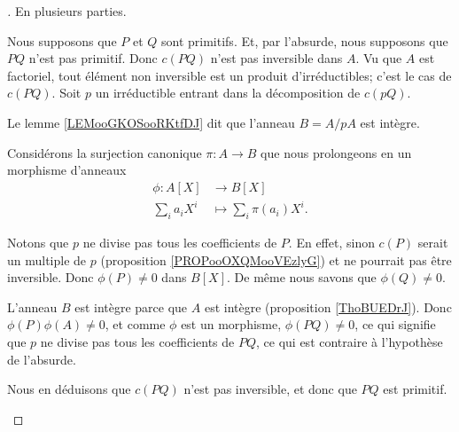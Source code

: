 \begin{proof}[\cite{BIBooXBJQooOCerti}]
	En plusieurs parties.
	\begin{subproof}
		\spitem[\ref{ITEMooISPDooXdRywE}\( \Rightarrow\)]
		Nous supposons que \( P\) et \( Q\) sont primitifs. Et, par l'absurde, nous supposons que \( PQ\) n'est pas primitif. Donc \( c(PQ)\) n'est pas inversible dans \( A\). Vu que \( A\) est factoriel, tout élément non inversible est un produit d'irréductibles; c'est le cas de \( c(PQ)\). Soit \( p\) un irréductible entrant dans la décomposition de \( c(pQ)\).

		Le lemme \ref{LEMooGKOSooRKtfDJ} dit que l'anneau \( B=A/pA\) est intègre.

		Considérons la surjection canonique \(\pi \colon A\to B  \) que nous prolongeons en un morphisme d'anneaux
		\begin{equation}
			\begin{aligned}
				\phi\colon A[X] & \to B[X]                   \\
				\sum_ia_iX^i    & \mapsto \sum_i\pi(a_i)X^i.
			\end{aligned}
		\end{equation}

		Notons que \( p\) ne divise pas tous les coefficients de \( P\). En effet, sinon \( c(P)\) serait un multiple de \( p\) (proposition \ref{PROPooOXQMooVEzlyG}) et ne pourrait pas être inversible. Donc \( \phi(P)\neq 0\) dans \( B[X]\). De même nous savons que \( \phi(Q)\neq 0\).

		L'anneau \( B\) est intègre parce que \( A\) est intègre (proposition \ref{ThoBUEDrJ}). Donc \( \phi(P)\phi(A)\neq 0\), et comme \( \phi\) est un morphisme, \( \phi(PQ)\neq 0\), ce qui signifie que \( p\) ne divise pas tous les coefficients de \( PQ\), ce qui est contraire à l'hypothèse de l'absurde.

		Nous en déduisons que \( c(PQ)\) n'est pas inversible, et donc que \( PQ\) est primitif.

		\spitem[\ref{ITEMooISPDooXdRywE}\( \Leftarrow\)]


\end{subproof}
\end{proof}
